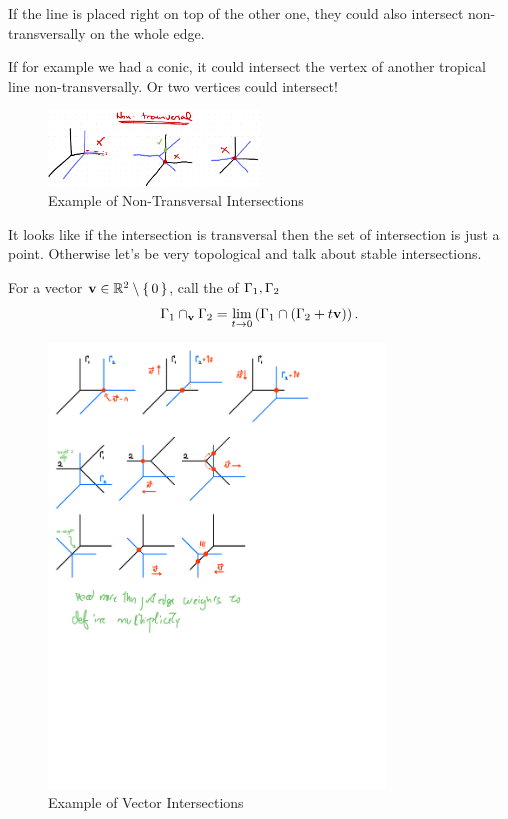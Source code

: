 \documentclass[12pt]{memoir}
\begin{document}
\begin{Ex}
    If the line is placed right on top of the other one, they could also intersect non-transversally on the whole edge.\par 
    If for example we had a conic, it could intersect the vertex of another tropical line non-transversally. Or two vertices could intersect!
    \begin{figure}[h!]
        \centering
        \includegraphics[width=0.5\textwidth]{figs/fig11-2-NonTransversalIntersectionExample.png}
        \caption{Example of Non-Transversal Intersections}
        \label{fig:11.2-NonTransversalIntersectionExample}
    \end{figure}
\end{Ex}

It looks like if the intersection is transversal then the set of intersection is just a point. Otherwise let's be very topological and talk about stable intersections.

\begin{Def}
    For a vector $\mathbf{v}\in\mathbb{R}^2\setminus\{\,0\,\}$, call the  of $\Gamma_1,\Gamma_2$
    $$\Gamma_1\cap_{\mathbf{v}}\Gamma_2=\lim_{t\to 0}\left(\Gamma_1\cap(\Gamma_2+t\mathbf{v})\right).$$
\end{Def}

\begin{figure}[h!]
    \centering
    \includegraphics[width=0.8\textwidth, trim= 0.1cm 23.25cm 5cm 0.25cm,clip]{figs/fig11-3-4-and-5-VectorIntersections.pdf}
    \caption{Example of Vector Intersections}
    \label{fig:11.3-VectorIntersection1}
\end{figure} 
\end{document}

